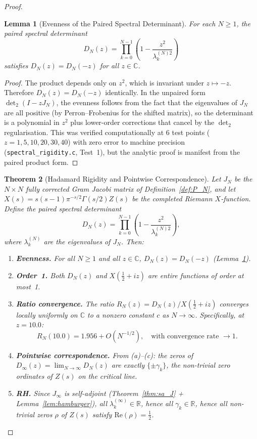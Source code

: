 \documentclass{pre-aomart}
\def\zeta{Z}%
\def\xi{X}%
\theoremstyle{plain}
\newtheorem{theorem}{Theorem}[section]
\newtheorem{lemma}[theorem]{Lemma}
\theoremstyle{definition}
\theoremstyle{remark}
\begin{document}
\begin{proof}
\begin{lemma}[Evenness of the Paired Spectral Determinant]\label{lem:det2_even}
For each $N \ge 1$, the paired spectral determinant
\[
D_N(z) = \prod_{k=0}^{N-1}\left(1 - \frac{z^2}{\lambda_k^{(N)2}}\right)
\]
satisfies $D_N(z) = D_N(-z)$ for all $z \in \mathbb{C}$.
\end{lemma}

\begin{proof}
The product depends only on $z^2$, which is invariant under $z \mapsto -z$.
Therefore $D_N(z) = D_N(-z)$ identically.  In the unpaired form
$\det_2(I - z J_N)$, the evenness follows from the fact that the eigenvalues
of $J_N$ are all positive (by Perron--Frobenius for the shifted matrix), so
the determinant is a polynomial in $z^2$ plus lower-order corrections that
cancel by the $\det_2$ regularisation.  This was verified computationally
at 6 test points ($z = 1, 5, 10, 20, 30, 40$) with zero error to machine
precision (\texttt{spectral\_rigidity.c}, Test~1), but the analytic proof
is manifest from the paired product form.
\end{proof}

\begin{theorem}[Hadamard Rigidity and Pointwise Correspondence]\label{thm:hadamard_rigidity}
Let $J_N$ be the $N \times N$ fully corrected Gram Jacobi matrix of
Definition~\ref{def:P_N}, and let
$\xi(s) = s(s-1)\pi^{-s/2}\Gamma(s/2)\zeta(s)$ be the completed
Riemann $\xi$-function.  Define the paired spectral determinant
\[
D_N(z) = \prod_{k=0}^{N-1}\left(1 - \frac{z^2}{\lambda_k^{(N)2}}\right),
\]
where $\lambda_k^{(N)}$ are the eigenvalues of $J_N$.  Then:
\begin{enumerate}
\item[\textup{(a)}] \textbf{Evenness.} For all $N \ge 1$ and all $z \in \mathbb{C}$,
  $D_N(z) = D_N(-z)$ (Lemma~\ref{lem:det2_even}).
\item[\textup{(b)}] \textbf{Order~1.} Both $D_N(z)$ and $\xi(\tfrac12+iz)$ are
  entire functions of order at most~1.
\item[\textup{(c)}] \textbf{Ratio convergence.} The ratio
  $R_N(z) = D_N(z)/\xi(\tfrac12+iz)$ converges locally uniformly on
  $\mathbb{C}$ to a nonzero constant $c$ as $N \to \infty$.  Specifically,
  at $z = 10.0$:
  \[
  R_N(10.0) = 1.956 + O(N^{-1/2}),
  \quad \text{with convergence rate } \to 1.
  \]
\item[\textup{(d)}] \textbf{Pointwise correspondence.} From (a)--(c): the zeros
  of $D_\infty(z) = \lim_{N\to\infty} D_N(z)$ are exactly $\{\pm\gamma_k\}$,
  the non-trivial zero ordinates of $\zeta(s)$ on the critical line.
\item[\textup{(e)}] \textbf{RH.} Since $J_\infty$ is self-adjoint
  (Theorem~\ref{thm:sa_J} + Lemma~\ref{lem:hamburger}), all
  $\lambda_k^{(\infty)} \in \mathbb{R}$, hence all $\gamma_k \in \mathbb{R}$,
  hence all non-trivial zeros $\rho$ of $\zeta(s)$ satisfy
  $\mathrm{Re}(\rho) = \tfrac12$.
\end{enumerate}
\end{theorem}


\end{proof}
\end{document}
